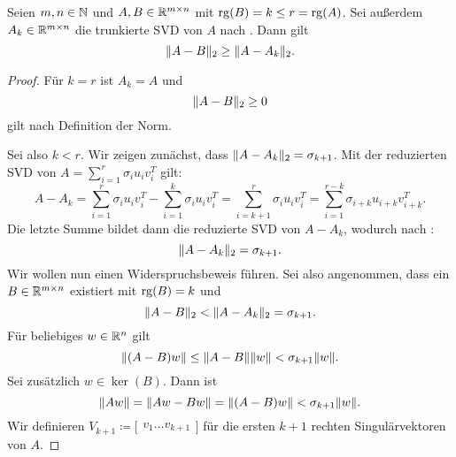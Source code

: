 \begin{theorem}\label{th:eckyou}
    Seien \(m,n \in \mathbb{N}\) und \(A,B \in \mathbb{R}^{m \times n}\) mit \(\operatorname{rg}(B) = k \leq r = \operatorname{rg}(A)\).
    Sei außerdem \(A_{k} \in \mathbb{R}^{m \times n}\) die trunkierte SVD von \(A\) nach .
    Dann gilt
    \begin{equation*}
        \lVert A-B\rVert_{2} \geq \lVert A - A_{k}\rVert_{2}.
    \end{equation*}   
\end{theorem}
\begin{proof}
    Für \(k=r\) ist \(A_{k}=A\) und 
    \begin{equation*}
        \lVert A-B\rVert_{2} \geq 0
    \end{equation*}
    gilt nach Definition der Norm. 

    Sei also \(k < r\).
    Wir zeigen zunächst, dass \(\lVert A-A_{k}\rVert_{2} = \sigma_{k+1}\).
    Mit der reduzierten SVD von \(A = \sum_{i=1}^{r}\sigma_{i}u_{i}v_{i}^{T}\) gilt:
    \begin{equation*}
        A-A_{k} = \sum_{i=1}^{r}\sigma_{i}u_{i}v_{i}^{T} - \sum_{i=1}^{k}\sigma_{i}u_{i}v_{i}^{T} = \sum_{i=k+1}^{r}\sigma_{i}u_{i}v_{i}^{T}=\sum_{i=1}^{r-k}\sigma_{i+k}u_{i+k}v_{i+k}^{T}.
    \end{equation*}
    Die letzte Summe bildet dann die reduzierte SVD von \(A-A_{k}\), wodurch nach : 
    \begin{equation*}
        \lVert A-A_{k}\rVert_{2} = \sigma_{k+1}.
    \end{equation*}
    Wir wollen nun einen Widerspruchsbeweis führen.
    Sei also angenommen, dass ein \(B \in \mathbb{R}^{m \times n}\) existiert mit \(\operatorname{rg}(B)=k\) und 
    \begin{equation*}
        \lVert A-B\rVert_{2} < \lVert A-A_{k}\rVert_{2} = \sigma_{k+1}.
    \end{equation*}
    Für beliebiges \(w \in \mathbb{R}^{n}\) gilt
    \begin{equation*}
        \lVert(A-B)w\rVert \leq \lVert A-B\rVert\lVert w\rVert < \sigma_{k+1}\lVert w\rVert.
    \end{equation*}  
    Sei zusätzlich \(w \in \ker(B)\). Dann ist 
    \begin{equation}
        \lVert Aw\rVert = \lVert Aw-Bw\rVert = \lVert(A-B)w\rVert < \sigma_{k+1}\lVert w\rVert \label{eq:eck1}.
    \end{equation}
    Wir definieren \(V_{k+1} \coloneq 
    \big[
        \begin{matrix}
            v_{1} \ldots v_{k+1}
        \end{matrix}
    \big]
    \) 
    für die ersten \(k+1\) rechten Singulärvektoren von \(A\).
    

\end{proof}
